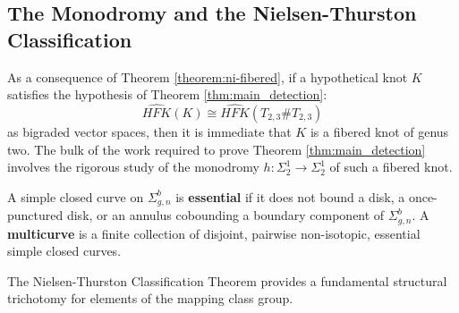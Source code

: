 \subsection*{The Monodromy and the Nielsen-Thurston Classification}
As a consequence of Theorem \ref{theorem:ni-fibered}, if a hypothetical knot $K$ satisfies the hypothesis of Theorem \ref{thm:main_detection}:
\[
\widehat{HFK}(K) \cong \widehat{HFK}(T_{2,3} \# T_{2,3})
\]
as bigraded vector spaces, then it is immediate that $K$ is a fibered knot of genus two. The bulk of the work required to prove Theorem \ref{thm:main_detection} involves the rigorous study of the monodromy $h \colon \Sigma_2^1 \to \Sigma_2^1$ of such a fibered knot.

A simple closed curve on $\Sigma_{g,n}^b$ is \textbf{essential} if it does not bound a disk, a once-punctured disk, or an annulus cobounding a boundary component of $\Sigma_{g,n}^b$. A \textbf{multicurve} is a finite collection of disjoint, pairwise non-isotopic, essential simple closed curves.

The Nielsen-Thurston Classification Theorem provides a fundamental structural trichotomy for elements of the mapping class group.

